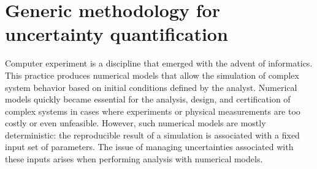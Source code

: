 \section*{Generic methodology for uncertainty quantification} 

Computer experiment is a discipline that emerged with the advent of informatics. 
This practice produces numerical models that allow the simulation of complex system behavior based on initial conditions defined by the analyst. 
Numerical models quickly became essential for the analysis, design, and certification of complex systems in cases where experiments or physical measurements are too costly or even unfeasible. 
However, such numerical models are mostly deterministic: the reproducible result of a simulation is associated with a fixed input set of parameters. 
The issue of managing uncertainties associated with these inputs arises when performing analysis with numerical models. 

